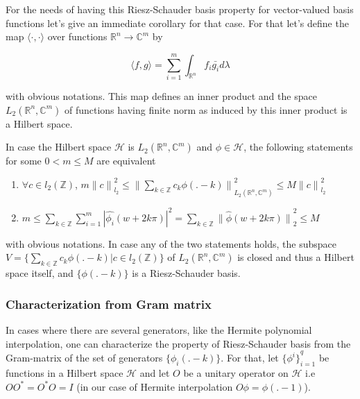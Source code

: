 \documentclass[a4paper, 11pt]{article}
\begin{document}
For the needs of having this Riesz-Schauder basis property for vector-valued basis functions let's give an immediate 
corollary for that case. For that let's define the map $\langle \cdot, \cdot \rangle$ over functions $\mathbb{R}^n \to 
\mathbb{C}^m$ by 

\begin{equation*}
  \langle f,g\rangle = \sum_{i=1}^m \int_{\mathbb{R}^n} f_i\bar{g_i} d\lambda
\end{equation*}
  
with obvious notations.  This map defines an inner product and the space $L_2(\mathbb{R}^n, \mathbb{C}^m)$ of functions 
having finite norm as induced by this inner product is a Hilbert space.


\begin{thm}{3}\label{thm:multi}
  In case the Hilbert space $\mathcal{H}$ is $L_2(\mathbb{R}^n, \mathbb{C}^m)$ and $\phi \in \mathcal{H}$, the following 
  statements for some $0 < m \leq M$ are equivalent
  \begin{enumerate}
    \item $\forall c \in l_2(\mathbb{Z})$,  $\displaystyle m {\|c\|}_{l_2}^2 \leq {\| \sum_{k \in \mathbb{Z}} c_k 
      \phi(.-k) \|}_{L_2(\mathbb{R}^n, \mathbb{C}^m)}^2 \leq M {\|c\|}_{l_2}^2$
    \item $\displaystyle m \leq  \sum_{k \in \mathbb{Z}} \sum_{i=1}^m {|\hat{\phi_i}(w+2k\pi)|}^2 = \sum_{k \in 
      \mathbb{Z}} {\|\hat{\phi}(w+2k\pi)\|}_{2}^2  \leq M$
  \end{enumerate}
  with obvious notations. In case any of the two statements holds, the subspace $\displaystyle V= \{ \sum_{k \in 
  \mathbb{Z}} c_k \phi(.-k) | c \in l_2(\mathbb{Z}) \}$ of $L_2(\mathbb{R}^n, \mathbb{C}^m)$ is closed and thus a 
  Hilbert space itself, and $\{\phi(.-k)\}$ is a Riesz-Schauder basis.
\end{thm}

\subsubsection{Characterization from Gram matrix}

In cases where there are several generators, like the Hermite polynomial interpolation, one can characterize the 
property of Riesz-Schauder basis from the Gram-matrix of the set of generators $\{\phi_i(.-k)\}$. For that, let 
${\{\phi^i\}}_{i=1}^q$ be functions in a Hilbert space $\mathcal{H}$ and let $O$ be a unitary operator on $\mathcal{H}$ 
i.e $OO^* = O^*O = I$ (in our case of Hermite interpolation $O\phi = \phi(.-1)$). \\ 
\end{document}

